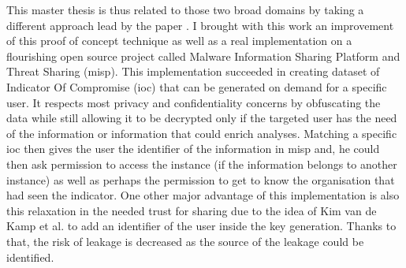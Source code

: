 \documentclass{eplmastersthesis}
\begin{document}
This master thesis is thus related to those two broad domains by taking a different approach lead by the paper \cite{van2016private}. I brought with this work an improvement of this proof of concept technique as well as a real implementation on a flourishing open source project called Malware Information Sharing Platform and Threat Sharing (\gls{misp}).
This implementation succeeded in creating dataset of Indicator Of Compromise (\gls{ioc}) that can be generated on demand for a specific user. It respects most privacy and confidentiality concerns by obfuscating the data while still allowing it to be decrypted only if the targeted user has the need of the information or information that could enrich analyses.
Matching a specific \gls{ioc} then gives the user the identifier of the information in \gls{misp} and, he could then ask permission to access the instance (if the information belongs to another instance) as well as perhaps the permission to get to know the organisation that had seen the indicator.
One other major advantage of this implementation is also this relaxation in the needed trust for sharing due to the idea of Kim van de Kamp et al. to add an identifier of the user inside the key generation. Thanks to that, the risk of leakage is decreased as the source of the leakage could be identified.\\


\printglossary



\newpage

\backcoverpage
\end{document}
